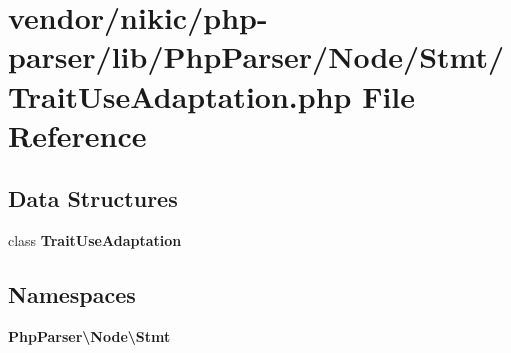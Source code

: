\section{vendor/nikic/php-\/parser/lib/\+Php\+Parser/\+Node/\+Stmt/\+Trait\+Use\+Adaptation.php File Reference}
\label{_trait_use_adaptation_8php}
\subsection*{Data Structures}
\begin{DoxyCompactItemize}
\item 
class {\bf Trait\+Use\+Adaptation}
\end{DoxyCompactItemize}
\subsection*{Namespaces}
\begin{DoxyCompactItemize}
\item 
 {\bf Php\+Parser\textbackslash{}\+Node\textbackslash{}\+Stmt}
\end{DoxyCompactItemize}
